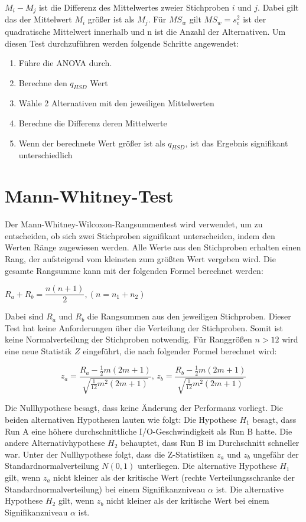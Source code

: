$M_i - M_j$ ist die Differenz des Mittelwertes zweier Stichproben $i$ und $j$.
Dabei gilt das der Mittelwert $M_i$ größer ist als $M_j$.
Für $MS_w$ gilt $MS_w = s^2_{e}$ ist der quadratische Mittelwert innerhalb und n ist die Anzahl
der Alternativen.
Um diesen Test durchzuführen werden folgende Schritte angewendet:

\begin{center}
  \begin{enumerate}
    \item Führe die ANOVA durch. 
    \item Berechne den $q_{HSD}$ Wert
    \item Wähle 2 Alternativen mit den jeweiligen Mittelwerten
    \item Berechne die Differenz deren Mittelwerte
    \item Wenn der berechnete Wert größer ist als $q_{HSD}$, ist das Ergebnis signifikant unterschiedlich 
  \end{enumerate}
\end{center}


\section{Mann-Whitney-Test}
Der Mann-Whitney-Wilcoxon-Rangsummentest \cite[130 ff.]{statistik_sozialwissenschaften} \cite{u_test} wird verwendet, um zu entscheiden, 
ob sich zwei Stichproben signifikant unterscheiden, indem den Werten Ränge zugewiesen werden. Alle Werte aus den Stichproben erhalten einen Rang,
 der aufsteigend vom kleinsten zum größten Wert vergeben wird. Die gesamte Rangsumme kann mit der folgenden Formel berechnet werden:
\begin{center}
  $R_a + R_b = \dfrac{n(n + 1)}{2}, (n = n_1 + n_2)$
\end{center}  

Dabei sind $R_a$ und $R_b$ die Rangsummen aus den jeweiligen Stichproben.
Dieser Test
hat keine Anforderungen über die Verteilung der Stichproben.
Somit ist keine Normalverteilung der Stichproben notwendig.
Für Ranggrößen $n>12$ wird eine neue Statistik $Z$ eingeführt, die nach folgender Formel berechnet wird:
\begin{center}
  \[
    z_{a} = \frac{R_{a} - \frac{1}{2}m(2m+1)}{\sqrt{\frac{1}{12}m^2(2m+1)}} \text{, }
    z_{b} = \frac{R_{b} - \frac{1}{2}m(2m+1)}{\sqrt{\frac{1}{12}m^2(2m+1)}}
  \]
\end{center}

Die Nullhypothese besagt, dass keine Änderung der Performanz vorliegt. 
Die beiden alternativen Hypothesen lauten wie folgt: Die Hypothese $H_1$ besagt, dass Run A eine höhere durchschnittliche I/O-Geschwindigkeit als Run B hatte. 
Die andere Alternativhypothese $H_2$ behauptet, dass Run B im Durchschnitt schneller war.
Unter der Nullhypothese folgt, dass die Z-Statistiken $z_a$ und $z_b$ ungefähr der Standardnormalverteilung $N(0,1)$ unterliegen. 
Die alternative Hypothese $H_1$ gilt, wenn $z_a$ nicht kleiner als der kritische Wert (rechte Verteilungsschranke der Standardnormalverteilung)
 bei einem Signifikanzniveau $\alpha$ ist. Die alternative Hypothese $H_2$ gilt, wenn $z_b$ nicht kleiner als der kritische Wert bei einem Signifikanzniveau $\alpha$ ist.

